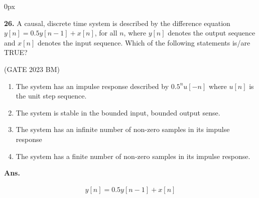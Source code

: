 \documentclass[journal,12pt,twocolumn]{IEEEtran}
\begin{document}
\parindent 0px


\vspace{3cm}

\title{}
\author{EE23BTECH11042 -  Khusinadha Naik$^{*}$
}
\maketitle
\newpage
\bigskip



\noindent \textbf{26.} \hspace{2pt}A causal, discrete time system is described by the difference equation $y[n] = 0.5 y[n-1] + x[n]$, for all $n$, where $y[n]$ denotes the output sequence and $x[n]$ denotes the input sequence. Which of the following statements is/are TRUE?
\begin{flushright}
\hfill(GATE 2023 BM)
\end{flushright}
\begin{enumerate}[label = (\alph*)]
	\item The system has an impulse response described by $0.5^{n} u[-n]$ where $u[n]$ is the  
unit step sequence. 	\label{option:GATE.2023.BM.26.1}	
	\item The system is stable in the bounded input, bounded output sense.		\label{option:GATE.2023.BM.26.2}
	\item The system has an infinite number of non-zero samples in its impulse response	\label{option:GATE.2023.BM.26.3}
	\item The system has a finite number of non-zero samples in its impulse response.	\label{option:GATE.2023.BM.26.4}
\end{enumerate}

\noindent \textbf{Ans.}\\

\begin{table}[h]

\end{table}
\begin{align}
y[n] = 0.5y[n-1] + x[n] 
\end{align}
\end{document}

